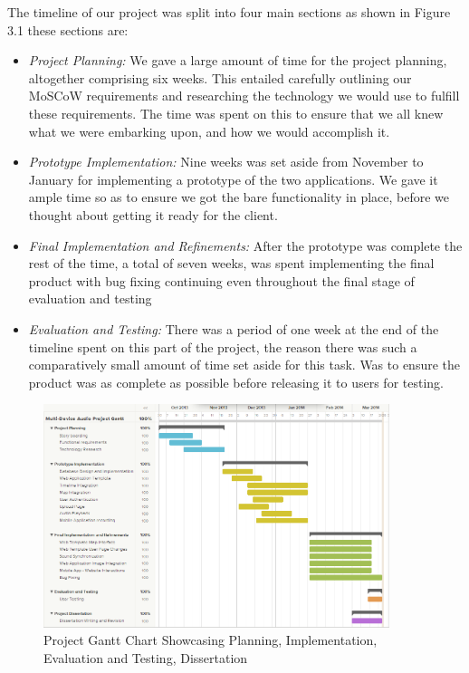 \documentclass{l3proj}
\begin{document}
The timeline of our project was split into four main sections as shown in Figure 3.1 these sections are:
\begin{itemize}
	\item{ \textit{Project Planning:} We gave a large amount of time for the project planning, altogether comprising six weeks. This entailed carefully outlining our MoSCoW requirements and researching the technology we would use to fulfill these requirements. The time was spent on this to ensure that we all knew what we were embarking upon, and how we would accomplish it.}
	\item{ \textit{Prototype Implementation:} Nine weeks was set aside from November to January for implementing a prototype of the two applications. We gave it ample time so as to ensure we got the bare functionality in place, before we thought about getting it ready for the client.}
	\item{ \textit{Final Implementation and Refinements:} After the prototype was complete the rest of the time, a total of seven weeks, was spent implementing the final product with bug fixing continuing even throughout the final stage of evaluation and testing}
	\item{ \textit{Evaluation and Testing:} There was a period of one week at the end of the timeline spent on this part of the project, the reason there was such a comparatively small amount of time set aside for this task. Was to ensure the product was as complete as possible before releasing it to users for testing.}
\end{itemize}

\begin{figure}[ht!]
  \centering
\includegraphics[width=0.9\textwidth]{images/gantt.png}
\caption{Project Gantt Chart Showcasing Planning, Implementation, Evaluation and Testing, Dissertation}
\end{figure}
\end{document}
